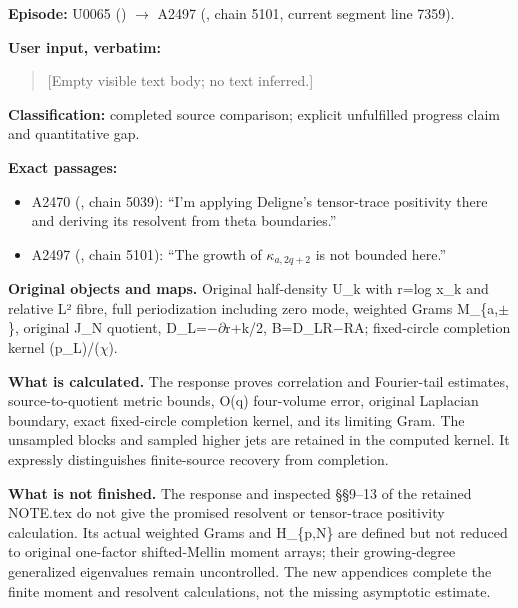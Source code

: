 \documentclass[10pt,a4paper,oneside]{report}
\providecommand{\tightlist}{\setlength{\itemsep}{0pt}\setlength{\parskip}{0pt}}
\begin{document}
\textbf{Episode:} U0065
(\protect{})
\allowbreak{}\ensuremath{→}\allowbreak{} A2497
(\protect{}, chain 5101,
current segment line 7359).

\textbf{User input, verbatim:}

\begin{quote}
{[}Empty visible text body; no text inferred.{]}
\end{quote}

\textbf{Classification:} completed source comparison; explicit
unfulfilled progress claim and quantitative gap.

\textbf{Exact passages:}

\begin{itemize}
\tightlist
\item
  A2470 (\protect{}, chain
  5039): ``I'm applying Deligne's tensor-trace positivity there and
  deriving its resolvent from theta boundaries.''
\item
  A2497 (\protect{}, chain
  5101): ``The growth of \(\kappa_{a,2q+2}\) is not bounded here.''
\end{itemize}

\textbf{Original objects and maps.} Original half-density U\_k with
r=log x\_k and relative L² fibre, full periodization including zero
mode, weighted Grams M\_\{a,\allowbreak{}\ensuremath{±}\allowbreak{}\},
original J\_N quotient,
D\_L=\allowbreak{}\ensuremath{−}\allowbreak{}\allowbreak{}\ensuremath{∂}\allowbreak{}r+k/2,
B=D\_LR\allowbreak{}\ensuremath{−}\allowbreak{}RA; fixed-circle
completion kernel (p\_L)/(\allowbreak{}\ensuremath{χ}\allowbreak{}).

\textbf{What is calculated.} The response proves correlation and
Fourier-tail estimates, source-to-quotient metric bounds, O(q)
four-volume error, original Laplacian boundary, exact fixed-circle
completion kernel, and its limiting Gram. The unsampled blocks and
sampled higher jets are retained in the computed kernel. It expressly
distinguishes finite-source recovery from completion.

\textbf{What is not finished.} The response and inspected §§9--13 of the
retained NOTE.tex do not give the promised resolvent or tensor-trace
positivity calculation. Its actual weighted Grams and H\_\{p,N\} are
defined but not reduced to original one-factor shifted-Mellin moment
arrays; their growing-degree generalized eigenvalues remain
uncontrolled. The new appendices complete the finite moment and
resolvent calculations, not the missing asymptotic estimate.
\end{document}
